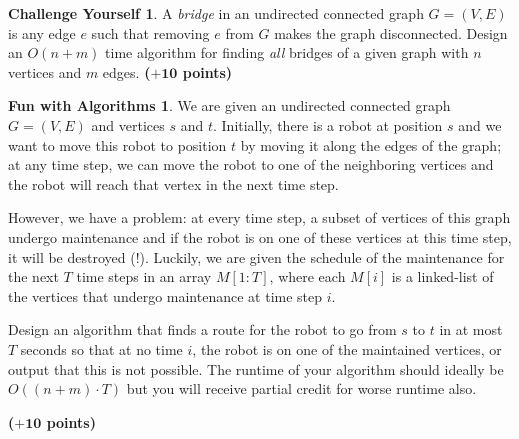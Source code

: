 \documentclass{article}
\theoremstyle{definition}
\newtheorem*{fun}{Fun with Algorithms}
\newtheorem*{challenge}{Challenge Yourself}
\newcommand{\grade}[1]{\hfill{\textbf{($\mathbf{#1}$ points)}}}
\begin{document}
\smallskip



\smallskip

\begin{challenge}
	A \emph{bridge} in an undirected connected graph $G=(V,E)$ is any edge $e$ such that removing $e$ from $G$ makes the graph disconnected. Design an $O(n+m)$ time algorithm
	 for finding \emph{all} bridges of a given graph with $n$ vertices and $m$ edges. \grade{+10}
\end{challenge}

\smallskip

\begin{fun}
	 We are given an undirected connected graph $G=(V,E)$ and  vertices $s$ and $t$. Initially, there is a robot at position  $s$ and we want to move this robot to position $t$ by moving it along the edges of the graph; at any time step, 
	 we can move the robot to one of the  neighboring vertices and the robot will reach that vertex in the next time step. 
	 
	 However, we have a problem: at every time step, a subset of vertices of this graph undergo  maintenance and if the robot is on one of these vertices at this time step, 
	 it will be destroyed (!). Luckily, we are given the schedule of the maintenance for the next $T$ time steps in an array $M[1:T]$, where each $M[i]$ is a linked-list of the vertices that undergo maintenance at time step $i$.  
	 
	 Design an
	 algorithm that finds a route for the robot to go from $s$ to $t$ in at most $T$ seconds so that at no time $i$, the robot is on one of the maintained vertices, or output that this is not possible. The runtime of your algorithm should ideally be $O((n+m) \cdot T)$ 
	 but you will receive partial credit for worse runtime also.  
	 
	 \grade{+10}
	 
	 \end{fun}
\end{document}
